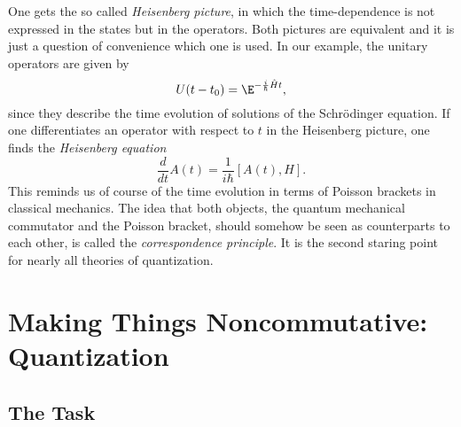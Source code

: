 One gets the so called \emph{Heisenberg picture}, in which the 
time-dependence is not expressed in the states but in the operators. Both 
pictures are equivalent and it is just a question of convenience which one is 
used. In our example, the unitary operators are given by
\begin{equation*}
	U(t - t_0)
	=
	\E^{- \frac{i}{\hbar} \hat{H} t},
\end{equation*}
since they describe the time evolution of solutions of the Schr\"odinger 
equation. If one differentiates an operator with respect to $t$ in the 
Heisenberg picture, one finds the \emph{Heisenberg equation}
\begin{equation*}
	\frac{d}{dt}
	A(t)
	=
	\frac{1}{i \hbar}
	[A(t), H].
\end{equation*}
This reminds us of course of the time evolution in terms of Poisson brackets in 
classical mechanics. The idea that both objects, the quantum mechanical commutator 
and the Poisson bracket, should somehow be seen as counterparts to each other, is 
called the \emph{correspondence principle}. It is the second staring point for 
nearly all theories of quantization.



\section{Making Things Noncommutative: Quantization}
\label{sec:chap2_Quantization}

\subsection{The Task}
\label{subsec:chap2_Task}

